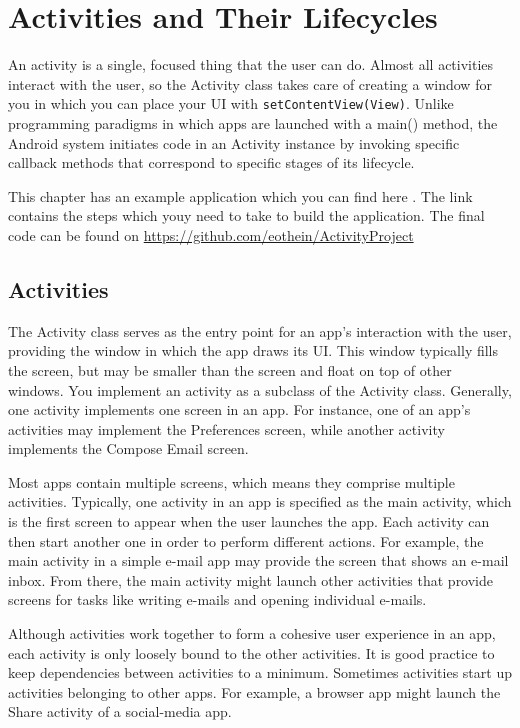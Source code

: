 

\chapter{Activities and Their Lifecycles}
An activity is a single, focused thing that the user can do.
Almost all activities interact with the user, so the Activity class takes care of creating a window for you in which you can place your UI with \texttt{setContentView(View)}. 
Unlike programming paradigms in which apps are launched with a main() method, the Android system initiates code in an Activity instance by invoking specific callback methods that correspond to specific stages of its lifecycle.

\begin{framed}
	This chapter has an example application which you can find here \cite{GoogleDevelopers2018}.
	The link contains the steps which youy need to take to build the application.
	The final code can be found on \url{https://github.com/eothein/ActivityProject}	
\end{framed}


\section{Activities}
The Activity class serves as the entry point for an app’s interaction with the user, providing the window in which the app draws its UI.
This window typically fills the screen, but may be smaller than the screen and float on top of other windows.
You implement an activity as a subclass of the Activity class.
Generally, one activity implements one screen in an app.
For instance, one of an app’s activities may implement the Preferences screen, while another activity implements the Compose Email screen.

Most apps contain multiple screens, which means they comprise multiple activities.
Typically, one activity in an app is specified as the main activity, which is the first screen to appear when the user launches the app.
Each activity can then start another one in order to perform different actions.
For example, the main activity in a simple e-mail app may provide the screen that shows an e-mail inbox.
From there, the main activity might launch other activities that provide screens for tasks like writing e-mails and opening individual e-mails.

Although activities work together to form a cohesive user experience in an app, each activity is only loosely bound to the other activities.
It is good practice to keep dependencies between activities to a minimum.
Sometimes activities start up activities belonging to other apps.
For example, a browser app might launch the Share activity of a social-media app.

